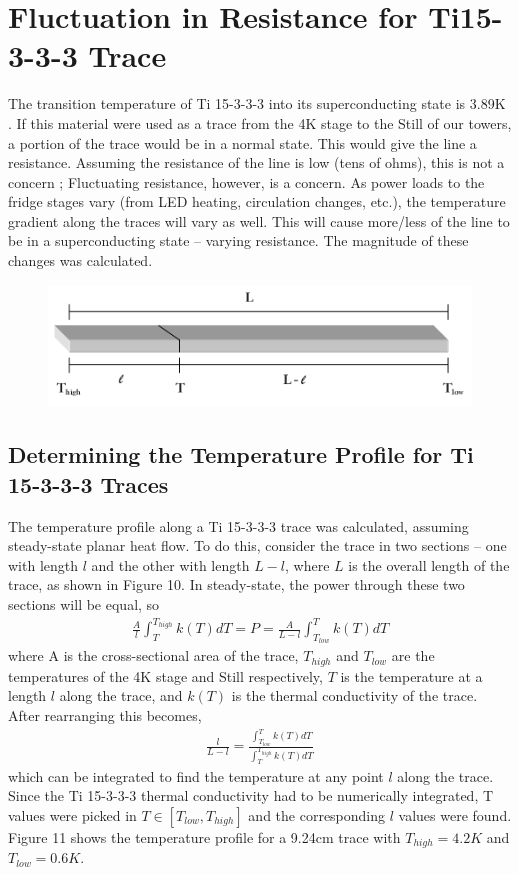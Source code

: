 \documentclass{report}
\begin{document}
\newpage
\section{Fluctuation in Resistance for Ti15-3-3-3 Trace}
The transition temperature of Ti 15-3-3-3 into its superconducting state is 3.89K \cite{wik}. If this material were used as a trace from the 4K stage to the Still of our towers, a portion of the trace would be in a normal state. This would give the line a resistance. Assuming the resistance of the line is low (tens of ohms), this is not a concern ; Fluctuating resistance, however, is a concern. As power loads to the fridge stages vary (from LED heating, circulation changes, etc.), the temperature gradient along the traces will vary as well. This will cause more/less of the line to be in a superconducting state -- varying resistance. The magnitude of these changes was calculated.

\begin{figure}[h]
\centering
\includegraphics[width = .5\textwidth]{Ti15333_trace_resistivity_section.png}
\caption{}
\end{figure}

\subsection{Determining the Temperature Profile for Ti 15-3-3-3 Traces}
The temperature profile along a Ti 15-3-3-3 trace was calculated, assuming steady-state planar heat flow. To do this, consider the trace in two sections -- one with length $l$ and the other with length $L-l$, where $L$ is the overall length of the trace, as shown in Figure 10. In steady-state, the power through these two sections will be equal, so
\begin{eqnarray}
\frac{A}{l}\int_{T}^{T_{high}} k(T)dT = P = \frac{A}{L - l}\int_{T_{low}}^{T} k(T)dT
\end{eqnarray}
where A is the cross-sectional area of the trace, $T_{high}$ and $T_{low}$ are the temperatures of the 4K stage and Still respectively, $T$ is the temperature at a length $l$ along the trace, and $k(T)$ is the thermal conductivity of the trace. After rearranging this becomes,
\begin{eqnarray}
\frac{l}{L-l} = \frac{\int_{T_{low}}^{T} k(T)dT}{\int_{T}^{T_{high}} k(T)dT}
\end{eqnarray}
which can be integrated to find the temperature at any point $l$ along the trace. Since the Ti 15-3-3-3 thermal conductivity had to be numerically integrated, T values were picked in $T \in [T_{low},T_{high}]$ and the corresponding $l$ values were found. Figure 11 shows the temperature profile for a 9.24cm trace with $T_{high} = 4.2K$ and $T_{low}=0.6K$.
\end{document}
